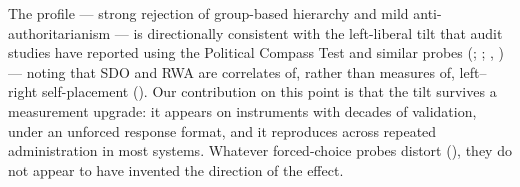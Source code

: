 \documentclass[
]{article}
\begin{document}
The profile --- strong rejection of group-based hierarchy and mild
anti-authoritarianism --- is directionally consistent with the
left-liberal tilt that audit studies have reported using the Political
Compass Test and similar probes (; ;
,
) --- noting that SDO and RWA are
correlates of, rather than measures of, left--right self-placement
(). Our contribution on this
point is that the tilt survives a measurement upgrade: it appears on
instruments with decades of validation, under an unforced response
format, and it reproduces across repeated administration in most
systems. Whatever forced-choice probes distort
(), they do not appear
to have invented the direction of the effect.
\end{document}
